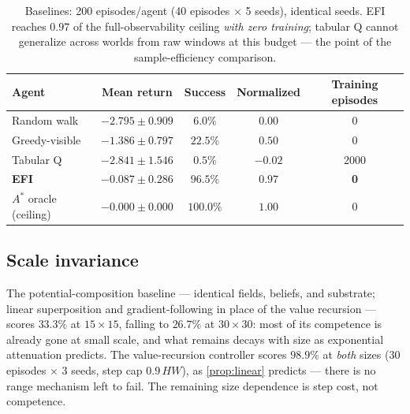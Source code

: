 \documentclass[11pt]{article}
\begin{document}
\begin{table}[t]
\centering
\caption{Baselines: 200 episodes/agent (40 episodes $\times$ 5 seeds), identical seeds. EFI reaches $0.97$ of the full-observability ceiling \emph{with zero training}; tabular Q cannot generalize across worlds from raw windows at this budget --- the point of the sample-efficiency comparison.}
\label{tab:baselines}
\begin{tabular}{lcccc}
\toprule
Agent & Mean return & Success & Normalized & Training episodes \\
\midrule
Random walk & $-2.795 \pm 0.909$ & $6.0\%$ & $0.00$ & 0 \\
Greedy-visible & $-1.386 \pm 0.797$ & $22.5\%$ & $0.50$ & 0 \\
Tabular Q & $-2.841 \pm 1.546$ & $0.5\%$ & $-0.02$ & 2000 \\
\textbf{EFI} & $\mathbf{-0.087 \pm 0.286}$ & $\mathbf{96.5\%}$ & $\mathbf{0.97}$ & \textbf{0} \\
$A^\ast$ oracle (ceiling) & $-0.000 \pm 0.000$ & $100.0\%$ & $1.00$ & 0 \\
\bottomrule
\end{tabular}
\end{table}

\subsection{Scale invariance}
The potential-composition baseline --- identical fields, beliefs, and substrate; linear superposition and gradient-following in place of the value recursion --- scores $33.3\%$ at $15{\times}15$, falling to $26.7\%$ at $30{\times}30$: most of its competence is already gone at small scale, and what remains decays with size as exponential attenuation predicts. The value-recursion controller scores $\mathbf{98.9\%}$ at \emph{both} sizes (30 episodes $\times$ 3 seeds, step cap $0.9\,HW$), as \cref{prop:linear} predicts --- there is no range mechanism left to fail. The remaining size dependence is step cost, not competence.
\end{document}
